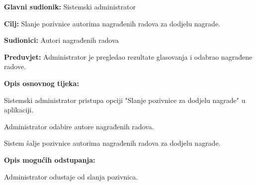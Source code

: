 					\noindent {}
					\begin{packed_item}
						\item \textbf{Glavni sudionik:} Sistemski administrator
						\item \textbf{Cilj:} Slanje pozivnice autorima nagrađenih radova za dodjelu nagrade.
						\item \textbf{Sudionici:} Autori nagrađenih radova
						\item \textbf{Preduvjet:} Administrator je pregledao rezultate glasovanja i odabrao nagrađene radove.
						\item \textbf{Opis osnovnog tijeka:}
						
						\begin{packed_enum}
							\item Sistemski administrator pristupa opciji "Slanje pozivnice za dodjelu nagrade" u aplikaciji.
							\item Administrator odabire autore nagrađenih radova.
							\item Sistem šalje pozivnice autorima nagrađenih radova za dodjelu nagrade.
						\end{packed_enum}
						
						\item \textbf{Opis mogućih odstupanja:}
						
						\begin{packed_item}
							\item[2.a] Administrator odustaje od slanja pozivnica.
						\end{packed_item}
					\end{packed_item}
					
